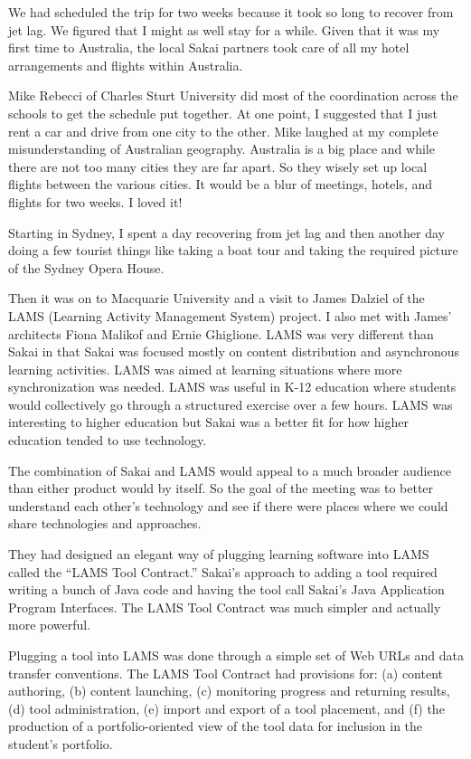 \documentclass[12pt]{book}
\begin{document}
We had scheduled the trip for two weeks because it took so long to recover
from jet lag.  We figured that I might as well stay for a while.
Given that it was my first time to Australia, the local
Sakai partners took care of all my hotel arrangements
and flights within Australia.

Mike Rebecci of Charles Sturt University did most of the
coordination across the schools to get the schedule put
together.  At one point, I suggested that I just rent a car
and drive from one city to the other.  Mike laughed at my
complete misunderstanding of Australian geography.  Australia
is a big place and while there are not too many cities they
are far apart.  So they wisely set up local flights
between the various cities.  It would be a blur of meetings,
hotels, and flights for two weeks.   I loved it!

Starting in Sydney, I spent a day recovering from
jet lag and then another day doing a few tourist things
like taking a boat tour and taking the required picture of
the Sydney Opera House.

Then it was on to Macquarie University and a visit to
James Dalziel of the LAMS (Learning Activity Management
System) project. I also met with James' architects
Fiona Malikof and Ernie Ghiglione.   LAMS was very
different than Sakai in that Sakai was focused mostly
on content distribution and asynchronous
learning activities.  LAMS was aimed at learning
situations where more synchronization was needed.
LAMS was useful in K-12 education where students would
collectively go through a structured exercise over
a few hours.  LAMS was interesting to higher education
but Sakai was a better fit for how higher
education tended to use technology.

The combination of Sakai and LAMS would appeal to a much
broader audience than either product would by itself.
So the goal of the meeting was to better understand
each other's technology and see if there were places where
we could share technologies and approaches.

They had designed an elegant way of plugging learning
software into LAMS called the ``LAMS Tool Contract.''
Sakai's approach to adding a tool required writing a
bunch of Java code and having the tool call Sakai's
Java Application Program
Interfaces.   The LAMS Tool Contract was much simpler
and actually more powerful.

Plugging a tool into LAMS was done through a simple set
of Web URLs and data transfer conventions.  The LAMS
Tool Contract had provisions for: (a) content authoring,
(b) content launching, (c) monitoring progress and
returning results, (d) tool administration, (e)
import and export of a tool placement, and (f)
the production of a portfolio-oriented view of the
tool data for inclusion in the student's portfolio.
\end{document}
